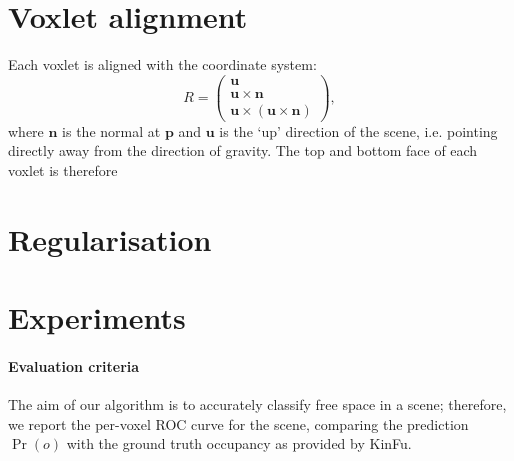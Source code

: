 \documentclass[10pt,twocolumn,letterpaper]{article}
\makeatletter
\renewcommand*{\ie}{i.e.\@\xspace}
\newcommand{\point}{\mathbf{p}}
\newcommand{\normal}{\mathbf{n}}
\newcommand{\updir}{\mathbf{u}}
\makeatother
\begin{document}




\section{Voxlet alignment}
Each voxlet is aligned with the coordinate system:
\begin{equation}
  R = 
  \left( \begin{array}{ccc}
  \updir \\
  \updir \times \normal \\
  \updir \times (\updir \times \normal)  \end{array} \right),
\end{equation}
where $\normal$ is the normal at $\point$ and $\updir$ is the `up' direction of the scene, \ie pointing directly away from the direction of gravity.
The top and bottom face of each voxlet is therefore 

\section{Regularisation}



\section{Experiments}

\paragraph{Evaluation criteria}
The aim of our algorithm is to accurately classify free space in a scene; therefore, we report the per-voxel ROC curve for the scene, comparing the prediction $\Pr(o)$ with the ground truth occupancy as provided by KinFu.
\end{document}
